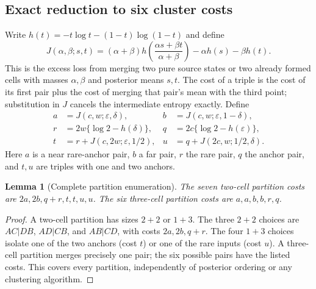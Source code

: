 \documentclass[11pt]{article}
\newtheorem{lemma}[theorem]{Lemma}
\theoremstyle{remark}\newtheorem{remark}[theorem]{Remark}
\begin{document}
\subsection{Exact reduction to six cluster costs}
Write $h(t)=-t\log t-(1-t)\log(1-t)$ and define
\[
 J(\alpha,\beta;s,t)
 =(\alpha+\beta)h\left(\frac{\alpha s+\beta t}{\alpha+\beta}\right)
       -\alpha h(s)-\beta h(t).
\]
This is the excess loss from merging two pure source states or two
already formed cells with masses $\alpha,\beta$ and posterior means $s,t$.
The cost of a triple is the cost of its first pair plus the cost of merging
that pair's mean with the third point; substitution in $J$ cancels the
intermediate entropy exactly. Define
\begin{align}
 a&=J(c,w;\varepsilon,\delta),&
 b&=J(c,w;\varepsilon,1-\delta),\nonumber\\
 r&=2w\{\log2-h(\delta)\},&
 q&=2c\{\log2-h(\varepsilon)\},\label{eq:six}\\
 t&=r+J(c,2w;\varepsilon,1/2),&
 u&=q+J(2c,w;1/2,\delta).\nonumber
\end{align}
Here $a$ is a near rare-anchor pair, $b$ a far pair, $r$ the rare pair,
$q$ the anchor pair, and $t,u$ are triples with one and two anchors.

\begin{lemma}[Complete partition enumeration]
\label{lem:enumeration}
The seven two-cell partition costs are $2a,2b,q+r,t,t,u,u$.
The six three-cell partition costs are $a,a,b,b,r,q$.
\end{lemma}
\begin{proof}
A two-cell partition has sizes $2+2$ or $1+3$. The three $2+2$ choices are
$AC|DB$, $AD|CB$, and $AB|CD$, with costs $2a,2b,q+r$.
The four $1+3$ choices isolate one of the two anchors (cost $t$) or one of
the rare inputs (cost $u$). A three-cell partition merges precisely one
pair; the six possible pairs have the listed costs. This covers every
partition, independently of posterior ordering or any clustering algorithm.
\end{proof}
\end{document}
